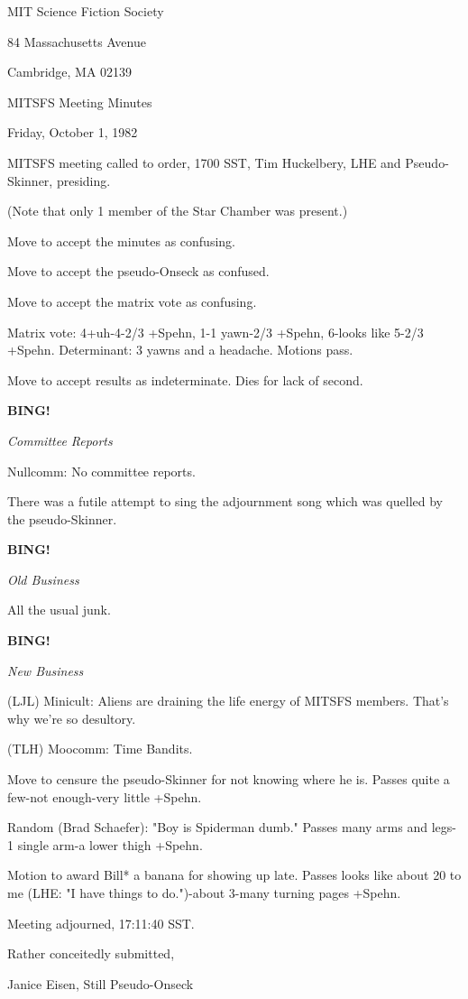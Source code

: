 \documentclass[12pt]{article}
\newcommand{\bing}{{\bf BING!} }
\newcommand{\goto}[1]{\bing \vskip 12pt \centerline{{\em{#1}}}}
\begin{document}
\begin{center}

MIT Science Fiction Society 

84 Massachusetts Avenue

Cambridge, MA 02139

\vspace{12pt}

MITSFS Meeting Minutes 

Friday, October 1, 1982

\end{center}
 
\vspace{18pt}

\setlength{\parskip}{6pt}

\noindent
MITSFS meeting called to order, 1700 SST,
Tim Huckelbery, LHE and Pseudo-Skinner, presiding.

(Note that only 1 member of the Star Chamber was present.)

Move to accept the minutes as confusing.

Move to accept the pseudo-Onseck as confused.

Move to accept the matrix vote as confusing.

Matrix vote: 4+uh-4-2/3 +Spehn, 1-1 yawn-2/3 +Spehn, 6-looks like 5-2/3 +Spehn. Determinant: 3 yawns and a headache. Motions pass.

Move to accept results as indeterminate. Dies for lack of second.

\goto{Committee Reports}

Nullcomm: No committee reports.

There was a futile attempt to sing the adjournment song which was quelled by the pseudo-Skinner.

\goto{Old Business}

All the usual junk.

\goto{New Business}

(LJL) Minicult: Aliens are draining the life energy of MITSFS members. That's why we're so desultory.

(TLH) Moocomm: Time Bandits.

Move to censure the pseudo-Skinner for not knowing where he is. Passes quite a few-not enough-very little +Spehn.

Random (Brad Schaefer): "Boy is Spiderman dumb." Passes many arms and legs-1 single arm-a lower thigh +Spehn.

Motion to award Bill* a banana for showing up late. Passes looks like about 20 to me (LHE: "I have things to do.")-about 3-many turning pages +Spehn.

\vspace{12pt}

\noindent
Meeting adjourned, 17:11:40 SST.

\vspace{18pt}

\centerline{Rather conceitedly submitted,}
\centerline{Janice Eisen, Still Pseudo-Onseck}
\end{document}
